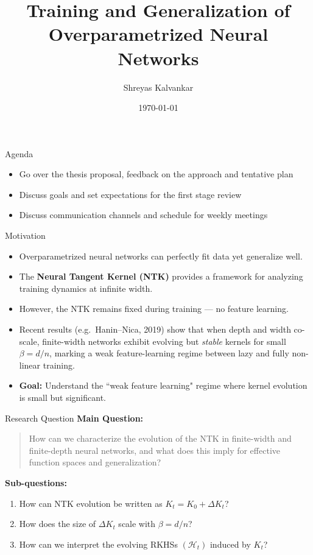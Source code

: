 \documentclass{beamer}
\title[Thesis Proposal]{Training and Generalization of Overparametrized Neural Networks}
\author[Shreyas Kalvankar]{Shreyas Kalvankar}
\institute{Master's Thesis Proposal Meeting}
\date{\today}
\begin{document}
\begin{frame}
	\titlepage
\end{frame}

\begin{frame}{Agenda}
	\begin{itemize}
		\item Go over the thesis proposal, feedback on the approach and tentative plan
		\item Discuss goals and set expectations for the first stage review
		\item Discuss communication channels and schedule for weekly meetings
	\end{itemize}
\end{frame}

\begin{frame}{Motivation}
	\begin{itemize}
		\item Overparametrized neural networks can perfectly fit data yet generalize well.
		\item The \textbf{Neural Tangent Kernel (NTK)} provides a framework for analyzing training dynamics at infinite width.
		\item However, the NTK remains fixed during training — no feature learning.
		\item Recent results (e.g.\ Hanin--Nica, 2019) show that when depth and width co-scale,
		      finite-width networks exhibit evolving but \emph{stable} kernels for small $\beta = d/n$,
		      marking a weak feature-learning regime between lazy and fully non-linear training.
		\item \textbf{Goal:} Understand the ``weak feature learning" regime where kernel evolution is small but significant.
	\end{itemize}
\end{frame}

\begin{frame}{Research Question}
	\textbf{Main Question:}
	\begin{quote}
		How can we characterize the evolution of the NTK in finite-width and finite-depth neural networks, and what does this imply for effective function spaces and generalization?
	\end{quote}
	\vspace{0.5em}
	\textbf{Sub-questions:}
	\begin{enumerate}
		\item How can NTK evolution be written as $K_t = K_0 + \Delta K_t$?
		\item How does the size of $\Delta K_t$ scale with $\beta = d/n$?
		\item How can we interpret the evolving RKHSs $(\mathcal{H}_t)$ induced by $K_t$?
	\end{enumerate}
\end{frame}
\end{document}
